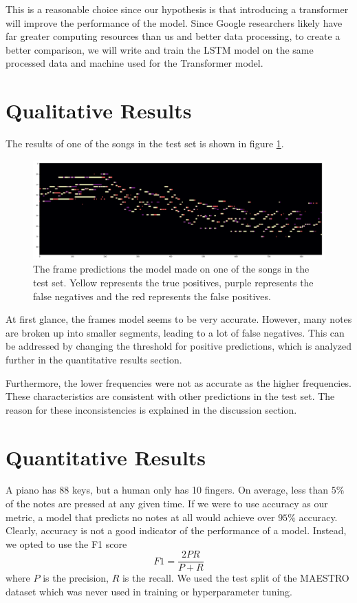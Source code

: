 \documentclass[a4paper,twocolumn,10pt]{article}
\begin{document}
This is a reasonable choice since our hypothesis is that introducing a transformer will improve the performance of the model. Since Google researchers likely have far greater computing resources than us and better data processing, to create a better comparison, we will write and train the LSTM model on the same processed data and machine used for the Transformer model.  

\section{Qualitative Results}
The results of one of the songs in the test set is shown in figure \ref{fig:results}.
\begin{figure}[h!]
  \centering
  \includegraphics[width=\linewidth]{figures/results.png}
  \caption{The frame predictions the model made on one of the songs in the test set. Yellow represents the true positives, purple represents the false negatives and the red represents the false positives.}
  \label{fig:results}
\end{figure}
At first glance, the frames model seems to be very accurate. However, many notes are broken up into smaller segments, leading to a lot of false negatives. This can be addressed by changing the threshold for positive predictions, which is analyzed further in the quantitative results section.

Furthermore, the lower frequencies were not as accurate as the higher frequencies. These characteristics are consistent with other predictions in the test set. The reason for these inconsistencies is explained in the discussion section.
\section{Quantitative Results}

A piano has 88 keys, but a human only has 10 fingers. On average, less than $5\%$ of the notes are pressed at any given time. If we were to use accuracy as our metric, a model that predicts no notes at all would achieve over $95\%$ accuracy. Clearly, accuracy is not a good indicator of the performance of a model. Instead, we opted to use the F1 score
\begin{equation}
  F1 = \frac{2PR}{P+R}
\end{equation}
where $P$ is the precision, $R$ is the recall. We used the test split of the MAESTRO dataset which was never used in training or hyperparameter tuning.
\end{document}
